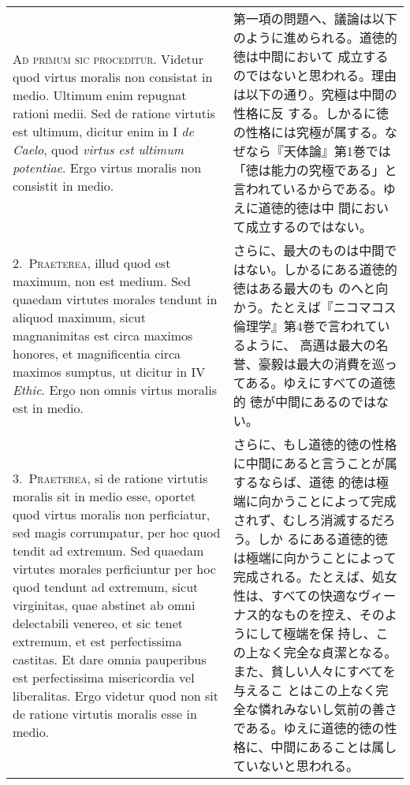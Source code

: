 \documentclass[10pt]{jsarticle}
\begin{document}
\begin{longtable}{p{21em}p{21em}}
{\scshape Ad primum sic proceditur}. Videtur quod virtus moralis non
consistat in medio. Ultimum enim repugnat rationi medii. Sed de
ratione virtutis est ultimum, dicitur enim in I {\itshape de Caelo},
quod {\itshape virtus est ultimum potentiae}. Ergo virtus moralis non
consistit in medio.

&

 第一項の問題へ、議論は以下のように進められる。道徳的徳は中間において
 成立するのではないと思われる。理由は以下の通り。究極は中間の性格に反
 する。しかるに徳の性格には究極が属する。なぜなら『天体論』第1巻では
 「徳は能力の究極である」と言われているからである。ゆえに道徳的徳は中
 間において成立するのではない。

\\



2.~{\scshape Praeterea}, illud quod est maximum, non est medium. Sed
quaedam virtutes morales tendunt in aliquod maximum, sicut
magnanimitas est circa maximos honores, et magnificentia circa maximos
sumptus, ut dicitur in IV {\itshape Ethic}. Ergo non omnis virtus
moralis est in medio.

&

 さらに、最大のものは中間ではない。しかるにある道徳的徳はある最大のも
 のへと向かう。たとえば『ニコマコス倫理学』第4巻で言われているように、
 高邁は最大の名誉、豪毅は最大の消費を巡ってある。ゆえにすべての道徳的
 徳が中間にあるのではない。

\\

3.~{\scshape Praeterea}, si de ratione virtutis moralis sit in medio
esse, oportet quod virtus moralis non perficiatur, sed magis
corrumpatur, per hoc quod tendit ad extremum. Sed quaedam virtutes
morales perficiuntur per hoc quod tendunt ad extremum, sicut
virginitas, quae abstinet ab omni delectabili venereo, et sic tenet
extremum, et est perfectissima castitas. Et dare omnia pauperibus est
perfectissima misericordia vel liberalitas. Ergo videtur quod non sit
de ratione virtutis moralis esse in medio.


&

 さらに、もし道徳的徳の性格に中間にあると言うことが属するならば、道徳
 的徳は極端に向かうことによって完成されず、むしろ消滅するだろう。しか
 るにある道徳的徳は極端に向かうことによって完成される。たとえば、処女
 性は、すべての快適なヴィーナス的なものを控え、そのようにして極端を保
 持し、この上なく完全な貞潔となる。また、貧しい人々にすべてを与えるこ
 とはこの上なく完全な憐れみないし気前の善さである。ゆえに道徳的徳の性
 格に、中間にあることは属していないと思われる。


\end{longtable}
\end{document}
